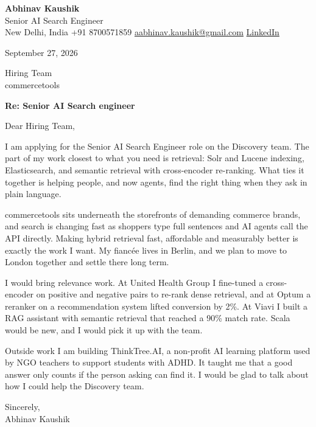 \documentclass[11pt,a4paper]{article}
\begin{document}
{\Large\bfseries Abhinav Kaushik}\\
Senior AI Search Engineer\\
New Delhi, India \textbar{} +91 8700571859 \textbar{} \href{mailto:aabhinav.kaushik@gmail.com}{aabhinav.kaushik@gmail.com} \textbar{} \href{https://www.linkedin.com/in/abhinav-kaushik10/}{LinkedIn}  

September 27, 2026

Hiring Team\\
commercetools

\textbf{Re: Senior AI Search engineer}

Dear Hiring Team,

I am applying for the Senior AI Search Engineer role on the Discovery team. The part of my work closest to what you need is retrieval: Solr and Lucene indexing, Elasticsearch, and semantic retrieval with cross-encoder re-ranking. What ties it together is helping people, and now agents, find the right thing when they ask in plain language.

commercetools sits underneath the storefronts of demanding commerce brands, and search is changing fast as shoppers type full sentences and AI agents call the API directly. Making hybrid retrieval fast, affordable and measurably better is exactly the work I want. My fiancée lives in Berlin, and we plan to move to London together and settle there long term.

I would bring relevance work. At United Health Group I fine-tuned a cross-encoder on positive and negative pairs to re-rank dense retrieval, and at Optum a reranker on a recommendation system lifted conversion by 2\%. At Viavi I built a RAG assistant with semantic retrieval that reached a 90\% match rate. Scala would be new, and I would pick it up with the team.

Outside work I am building ThinkTree.AI, a non-profit AI learning platform used by NGO teachers to support students with ADHD. It taught me that a good answer only counts if the person asking can find it. I would be glad to talk about how I could help the Discovery team.

Sincerely,\\[4pt]
Abhinav Kaushik
\end{document}
